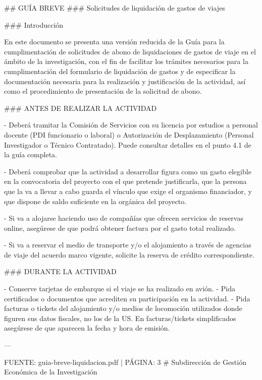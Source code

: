 \documentclass{article}
\begin{document}
\begin{itemize}
\begin{itemize}
\begin{scriptsize}
                  \#\# GUÍA BREVE
                  \#\#\# Solicitudes de liquidación de gastos de viajes

                  \#\#\# Introducción

                  En este documento se presenta una versión reducida de la Guía para la cumplimentación de solicitudes de abono de liquidaciones de gastos de viaje en el ámbito de la investigación, con el fin de facilitar los trámites necesarios para la cumplimentación del formulario de liquidación de gastos y de especificar la documentación necesaria para la realización y justificación de la actividad, así como el procedimiento de presentación de la solicitud de abono.

                  \#\#\# ANTES DE REALIZAR LA ACTIVIDAD

                  - Deberá tramitar la Comisión de Servicios con su licencia por estudios a personal docente (PDI funcionario o laboral) o Autorización de Desplazamiento (Personal Investigador o Técnico Contratado). Puede consultar detalles en el punto 4.1 de la guía completa.

                  - Deberá comprobar que la actividad a desarrollar figura como un gasto elegible en la convocatoria del proyecto con el que pretende justificarla, que la persona que la va a llevar a cabo guarda el vínculo que exige el organismo financiador, y que dispone de saldo suficiente en la orgánica del proyecto.

                  - Si va a alojarse haciendo uso de compañías que ofrecen servicios de reservas online, asegúrese de que podrá obtener factura por el gasto total realizado.

                  - Si va a reservar el medio de transporte y/o el alojamiento a través de agencias de viaje del acuerdo marco vigente, solicite la reserva de crédito correspondiente.

                  \#\#\# DURANTE LA ACTIVIDAD

                  - Conserve tarjetas de embarque si el viaje se ha realizado en avión.
                  - Pida certificados o documentos que acrediten su participación en la actividad.
                  - Pida facturas o tickets del alojamiento y/o medios de locomoción utilizados donde figuren sus datos fiscales, no los de la US. En facturas/tickets simplificados asegúrese de que aparecen la fecha y hora de emisión.

                  ---

                  FUENTE: guia-breve-liquidacion.pdf | PÁGINA: 3
                  \# Subdirección de Gestión Económica de la Investigación


\end{scriptsize}
\end{itemize}
\end{itemize}
\end{document}
